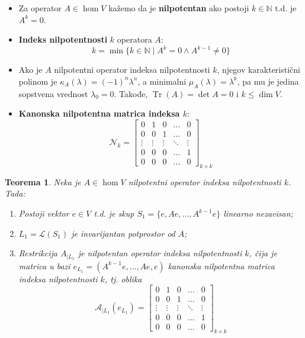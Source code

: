 \documentclass[a4paper,12pt,twoside]{report}
\newtheorem{theorem}{Teorema}[section]
\numberwithin{algorithm}{section}
\begin{document}
\begin{itemize}
    \item Za operator $A \in \hom V$ kažemo da je \textbf{nilpotentan} ako postoji $k \in \mathbb{N}$ t.d. je $A^k = 0$.
    \item \textbf{Indeks nilpotentnosti} $k$ operatora $A$: \[k = \min \{k \in \mathbb{N}\;|\;A^k = 0 \land A^{k-1}\neq 0\}\]
    \item Ako je $A$ nilpotentni operator indeksa nilpotentnosti $k$, njegov karakteristični polinom je $\kappa_A(\lambda) = (-1)^n\lambda^n$, a
    minimalni $\mu_A(\lambda) = \lambda^k$, pa mu je jedina sopstvena vrednost $\lambda_0 = 0$. Takođe, $\operatorname{Tr}(A) = \det A = 0$ i $k \leq \dim V$.
    \item \textbf{Kanonska nilpotentna matrica indeksa $k$}:
    \[ \mathcal{N}_k = \begin{bmatrix}
        0 & 1 & 0 & \dots & 0 \\
        0 & 0 & 1 & \dots & 0 \\
        \vdots & \vdots & \vdots & \ddots & \vdots \\
        0 & 0 & 0 & \dots & 1 \\
        0 & 0 & 0 & \dots & 0
    \end{bmatrix}_{k \times k} \]
\end{itemize}

\begin{theorem}
    Neka je $A \in \hom V$ nilpotentni operator indeksa nilpotentnosti $k$. Tada:
    \begin{enumerate}
        \item Postoji vektor $e \in V$ t.d. je skup $S_1 = \{e, Ae, \dots, A^{k-1}e\}$ linearno nezavisan;
        \item $L_1 = \mathcal{L}(S_1)$ je invarijantan potprostor od $A$;
        \item Restrikcija $A_{|L_1}$ je nilpotentan operator indeksa nilpotentnosti $k$, čija je matrica u bazi $e_{L_1} = (A^{k-1}e, \dots, Ae, e)$ 
        kanonska nilpotentna matrica indeksa nilpotentnosti $k$, tj. oblika
        \[ \mathcal{A}_{|L_1}(e_{L_1}) = \begin{bmatrix}
        0 & 1 & 0 & \dots & 0 \\
        0 & 0 & 1 & \dots & 0 \\
        \vdots & \vdots & \vdots & \ddots & \vdots \\
        0 & 0 & 0 & \dots & 1 \\
        0 & 0 & 0 & \dots & 0
    \end{bmatrix}_{k \times k} \]
    \end{enumerate}
\end{theorem}
\end{document}

